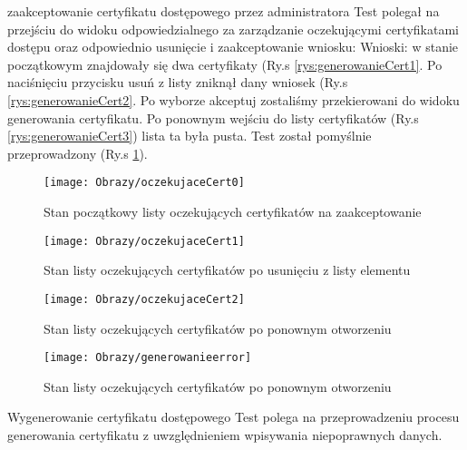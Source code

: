 \begin{enumerate*}
\begin{figure}[ht!]
	
	\end{figure}
	
	
	\item  zaakceptowanie certyfikatu dostępowego przez administratora
	Test polegał na przejściu do widoku odpowiedzialnego za zarządzanie oczekującymi certyfikatami dostępu oraz odpowiednio usunięcie i zaakceptowanie wniosku:
	Wnioski: w stanie początkowym znajdowały się dwa certyfikaty (Ry.s \ref{rys:generowanieCert1}. Po naciśnięciu przycisku usuń z listy zniknął dany wniosek (Ry.s \ref{rys:generowanieCert2}. Po wyborze akceptuj zostaliśmy przekierowani do widoku generowania certyfikatu. Po ponownym wejściu do listy certyfikatów (Ry.s \ref{rys:generowanieCert3}) lista ta była pusta. Test został pomyślnie przeprowadzony (Ry.s \ref{rys:generowanieCert4}). 
	
		\begin{figure}[ht!]
		
		\begin{minipage}{0.2\textwidth}
			\texttt{[image: Obrazy/oczekujaceCert0]}
			\caption{Stan początkowy listy oczekujących certyfikatów na zaakceptowanie }
			\label{rys:generowanieCert1}
		\end{minipage}
		\begin{minipage}{0.2\textwidth}
			\texttt{[image: Obrazy/oczekujaceCert1]}
			\caption{Stan listy oczekujących certyfikatów po usunięciu z listy elementu}
			\label{rys:generowanieCert2}
		\end{minipage}
		
		\begin{minipage}{0.2\textwidth}
			\texttt{[image: Obrazy/oczekujaceCert2]}
			\caption{Stan listy oczekujących certyfikatów po ponownym otworzeniu}
			\label{rys:generowanieCert3}
		\end{minipage}
	
	\begin{minipage}{0.2\textwidth}
		\texttt{[image: Obrazy/generowanieerror]}
		\caption{Stan listy oczekujących certyfikatów po ponownym otworzeniu}
		\label{rys:generowanieCert4}
	\end{minipage}
	
	\end{figure}
	
	
	
	\item  Wygenerowanie certyfikatu dostępowego
	Test polega na przeprowadzeniu procesu generowania certyfikatu z uwzględnieniem wpisywania niepoprawnych danych.
	

\end{enumerate*}
